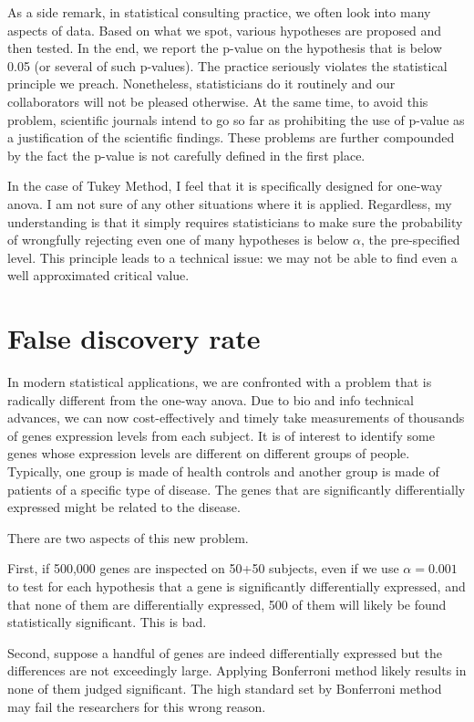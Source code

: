 As a side remark, in statistical consulting practice, we often
look into many aspects of data. Based on what we spot,
various hypotheses are proposed and then tested. 
In the end, we report the p-value on the hypothesis that is below 0.05 (or several of such
p-values). 
The practice seriously violates the statistical principle we preach.
Nonetheless, statisticians do it routinely and our collaborators
will not be pleased otherwise.
At the same time, to avoid this problem,
scientific journals intend to go so far as prohibiting the use
of p-value as a justification of the scientific findings.
These problems are further compounded by the fact the p-value
is not carefully defined in the first place.

In the case of Tukey Method, I feel that it is specifically designed
for one-way anova. I am not sure of any other situations where it is applied. 
Regardless, my understanding is that it simply
requires statisticians to make sure the probability of
wrongfully rejecting even one of many hypotheses is below
$\alpha$, the pre-specified level. 
This principle leads to a technical issue: we may not be
able to find even a well approximated critical value.

\section{False discovery rate}
In modern statistical applications, we are confronted with a problem
that is radically different from the one-way anova.
Due to bio and info technical advances, we can now
cost-effectively and timely take measurements of
thousands of genes expression levels from each subject.
It is of interest to identify some genes whose expression
levels are different on different groups of people.
Typically, one group is made of health controls and
another group is made of patients of a specific type
of disease. The genes that are significantly differentially
expressed might be related to the disease.

There are two aspects of this new problem.

First, if 500,000 genes are inspected on 50+50 subjects,
even if we use $\alpha = 0.001$ to test for each hypothesis
that a gene is significantly differentially expressed,
and that none of them are differentially expressed,
500 of them will likely be found statistically significant.
This is bad.

Second, suppose a handful of genes are indeed differentially
expressed but the differences are not exceedingly large. 
Applying Bonferroni method likely results in none of them
judged significant. The high standard set by Bonferroni method
may fail the researchers for this wrong reason.

